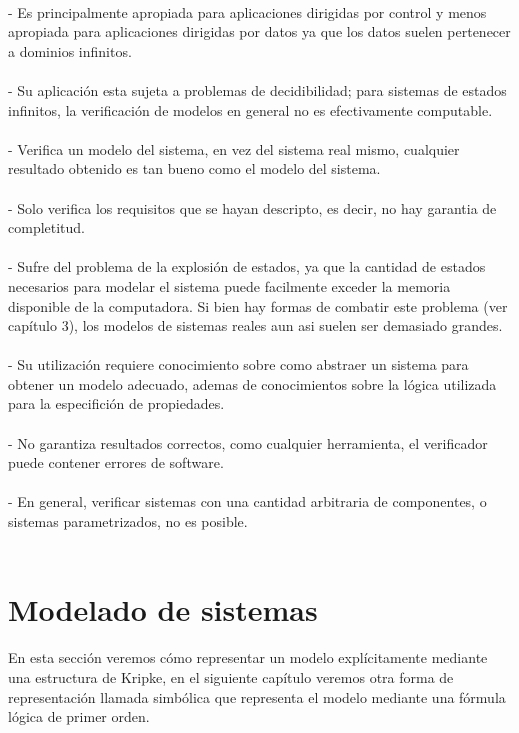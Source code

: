 \\
- Es principalmente apropiada para aplicaciones dirigidas por control y menos apropiada para aplicaciones dirigidas por datos ya que los datos suelen pertenecer a dominios infinitos.\\
\\
- Su aplicación esta sujeta a problemas de decidibilidad; para sistemas de estados infinitos, la verificación de modelos en general no es efectivamente computable.\\
\\
- Verifica un modelo del sistema, en vez del sistema real mismo, cualquier resultado obtenido es tan bueno como el modelo del sistema.\\
\\
- Solo verifica los requisitos que se hayan descripto, es decir, no hay garantia de completitud.\\
\\
- Sufre del problema de la explosión de estados, ya que la cantidad de estados necesarios para modelar el sistema puede facilmente exceder la memoria disponible de la computadora. Si bien hay formas de combatir este problema (ver capítulo 3), los modelos de sistemas reales aun asi suelen ser demasiado grandes.\\
\\
- Su utilización requiere conocimiento sobre como abstraer un sistema para obtener un modelo adecuado, ademas de conocimientos sobre la lógica utilizada para la especifición de propiedades.\\
\\
- No garantiza resultados correctos, como cualquier herramienta, el verificador puede contener errores de software.\\
\\
- En general, verificar sistemas con una cantidad arbitraria de componentes, o sistemas parametrizados, no es posible.\\
\\
\section{Modelado de sistemas}
En esta sección veremos cómo representar un modelo explícitamente mediante una estructura de Kripke, en el siguiente capítulo veremos otra forma de representación llamada simbólica que representa el modelo mediante una fórmula lógica de primer orden.

